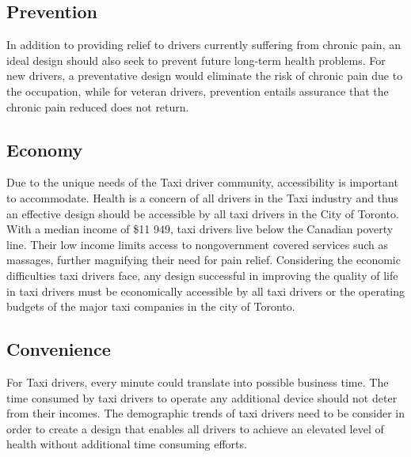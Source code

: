 \documentclass[11pt]{article}
\begin{document}
\subsection{Prevention}
In addition to providing relief to drivers currently suffering from 
chronic pain, an ideal design should also seek to prevent future long-term 
health problems. For new drivers, a preventative design would eliminate
the risk of chronic pain due to the occupation, while for veteran 
drivers, prevention entails assurance that the chronic pain reduced does
not return. 
 
\subsection{Economy}
Due to the unique needs of the Taxi driver community, accessibility is 
important to accommodate. Health is a concern of all drivers in the Taxi 
industry and thus an effective design should be accessible by all taxi 
drivers in the City of Toronto. With a median income of \$11 949, taxi drivers live below the Canadian poverty line\cite{poverty}.    
Their low income limits access to nongovernment covered services 
such as massages, further magnifying their need for pain relief. 
Considering the economic difficulties taxi drivers face\cite{facey2003health}, any design 
successful in improving the quality of life in taxi drivers must be
economically accessible by all taxi drivers or the operating 
budgets of the major taxi companies in the city of Toronto.

 
\subsection{Convenience}
For Taxi drivers, every minute could translate into possible business 
time\cite{ facey2003health}. The time consumed by taxi drivers to operate 
any additional device should not deter from their incomes. The demographic 
trends of taxi drivers need to be consider in order to create a design 
that enables all drivers to achieve an elevated level of health 
without additional time consuming efforts.



\end{document}
